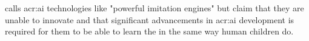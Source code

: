 \begin{comment}
In this section it is important to include a discussion of not just the merits of the work conducted, but also the limitations.
Which choices did you make? Why? What alternatives were there?
{\color{red}\textbf{Note that a key part of the Master's Thesis grading is based on the student's ability to discuss the results in light of the work by others as well as the restrictions and potential of the work itself.}}
While the Results section will report the outcome of each specific experiments, the Discussion should put those results into perspective and look at overall lessons that can be learned from the entire series of experiments.

You should be able to discuss your work in relation to its overall goal and your research questions (i.e., those introduced in Chapter~\ref{cha:introduction}),
but also address issues such as any ethical considerations that the work may entail,
as well as its technical challenges and limitations.

Discussion and evaluation can either be two different chapters, a joint chapter (as here), or part of the concluding chapter
--- or the discussion can be part of that chapter while the evaluation is part of the experimental chapter.

As for most parts of the thesis, it is possible to select various outlines and setups for the discussion; the important thing is that all the relevant parts appear \textit{somewhere\/} in the text.
\end{comment}

\cite{yiuTransmissionTruthImitation2023} calls \acrshort{acr:ai} technologies like  "powerful imitation engines" but claim that they are unable to innovate and that significant advancements in \acrshort{acr:ai} development is required for them to be able to learn the in the same way human children do.

\glsaddall